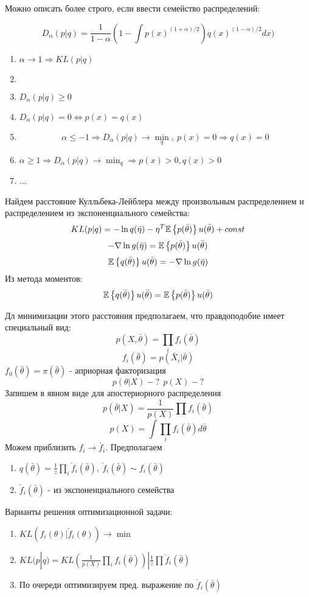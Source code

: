 Можно описать более строго, если ввести семейство распределений:
\begin{definition}
$$ D_{\alpha}(p|q) = \frac{1}{1-\alpha} (1-\int p(x)^{(1+\alpha)/2})q(x)^{(1-\alpha)/2} dx )$$
\begin{enumerate}
	\item $\alpha \to 1 \Rightarrow KL(p|q)$
	\item $ $
	\item $D_{\alpha}(p|q) \geq 0$
	\item $D_{\alpha}(p|q) = 0 \Leftrightarrow p(x) = q(x)$
	\item $$ \alpha \leq -1 \Rightarrow D_{\alpha}(p|q) \to \min_q, \ p(x) = 0 \Rightarrow q(x)=0 $$
	\item $\alpha \geq 1 \Rightarrow D_{\alpha}(p|q) \to \min_q \Rightarrow p(x) >0, q(x) > 0$
	\item ...
\end{enumerate}
\end{definition}

Найдем расстояние Кулльбека-Лейблера между произвольным распределением и распределением из экспоненциального семейства: 
$$ KL(p|q) = -\ln q(\bar{\eta}) - \eta^T \mathbb{E}\left\{ p(\bar{\theta}) \right\}{u(\bar{\theta})} + const $$
$$ - \nabla \ln g(\bar{\eta}) = \mathbb{E}\left\{ p(\bar{\theta}) \right\} u(\bar{\theta}) $$
$$ \mathbb{E}\left\{ q(\bar{\theta}) \right\}{u(\bar{\theta})} = - \nabla \ln g(\bar{\eta}) $$
Из метода моментов:  $$ \mathbb{E}\left\{ q(\bar{\theta}) \right\}{u(\bar{\theta})} = \mathbb{E}\left\{ p(\bar{\theta}) \right\}{u(\bar{\theta})} $$

Дл минимизации этого расстояния предполагаем, что правдоподобие имеет специальный вид: 
$$ p(X, \bar{\theta}) = \prod_i f_i(\bar{\theta}) $$
$$ f_i(\bar{\theta}) = p(\bar{X}_i|\bar{\theta}) $$
$f_0(\bar{\theta}) = \pi(\bar{\theta})$ - априорная факторизация
$$p(\theta|X) - ? \ \ p(X) - ?$$
Запишем в явном виде для апостериорного распределения
$$ p(\bar{\theta}|X) = \frac{1}{p(X)} \prod f_i(\bar{\theta}) $$
$$ p(X) = \int \prod_i f_i(\bar{\theta})d\bar{\theta} $$
Можем приблизить $f_i \to \check{f_i}$. Предполагаем \begin{enumerate}
	\item $q(\bar{\theta}) = \frac{1}{z} \prod_i \check{f}_i(\bar{\theta}), \ \check{f}_i(\bar{\theta}) \sim f_i(\bar{\theta})$
	\item $\check{f}_i(\bar{\theta})$ - из экспоненциального семейства
\end{enumerate}
Варианты решения оптимизационной задачи: \begin{enumerate}
	\item $ KL(f_i(\theta)|\check{f}_i(\theta)) \to \min$
	\item $ KL(p|q) = KL(\frac{1}{p(X)}\prod_i f_i(\bar{\theta}))| \frac{1}{z} \prod \check{f}_i(\bar{\theta})$
	\item По очереди оптимизируем пред. выражение по $\check{f}_i(\bar{\theta})$
\end{enumerate}


